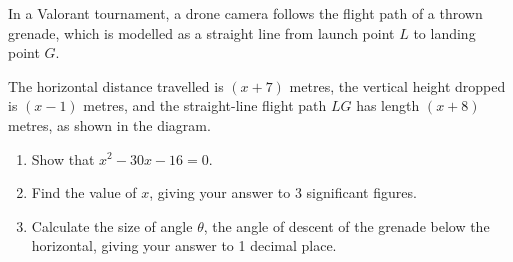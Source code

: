\begin{question}
\noindent In a Valorant tournament, a drone camera follows the flight path of a thrown grenade, which is modelled as a straight line from launch point $L$ to landing point $G$.

The horizontal distance travelled is $(x + 7)$ metres, the vertical height dropped is $(x - 1)$ metres, and the straight-line flight path $LG$ has length $(x + 8)$ metres, as shown in the diagram.

\begin{center}
\end{center}

\begin{enumerate}
    \item[(a)] Show that $x^2 - 30x - 16 = 0$.
    \vspace{4cm}

    \item[(b)] Find the value of $x$, giving your answer to 3 significant figures.
    \vspace{3.5cm}

    \item[(c)] Calculate the size of angle $\theta$, the angle of descent of the grenade below the horizontal, giving your answer to 1 decimal place.
    \vspace{4cm}
\end{enumerate}
\end{question}
